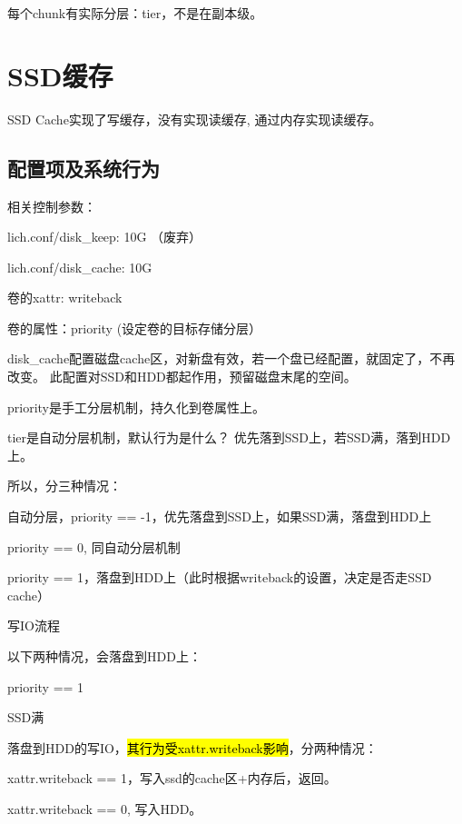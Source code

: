 每个chunk有实际分层：tier，不是在副本级。

\section{SSD缓存}

SSD Cache实现了写缓存，没有实现读缓存, 通过内存实现读缓存。

\subsection{配置项及系统行为}

相关控制参数：
\begin{enumbox}
\item lich.conf/disk\_keep: 10G （废弃）
\item lich.conf/disk\_cache: 10G
\item 卷的xattr: writeback
\item 卷的属性：priority (设定卷的目标存储分层）
\end{enumbox}

disk\_cache配置磁盘cache区，对新盘有效，若一个盘已经配置，就固定了，不再改变。
此配置对SSD和HDD都起作用，预留磁盘末尾的空间。

priority是手工分层机制，持久化到卷属性上。

tier是自动分层机制，默认行为是什么？ 优先落到SSD上，若SSD满，落到HDD上。

所以，分三种情况：
\begin{compactenum}
\item 自动分层，priority == -1，优先落盘到SSD上，如果SSD满，落盘到HDD上
\item priority == 0, 同自动分层机制
\item priority == 1，落盘到HDD上（此时根据writeback的设置，决定是否走SSD cache）
\end{compactenum}

写IO流程

以下两种情况，会落盘到HDD上：
\begin{compactenum}
\item priority == 1
\item SSD满
\end{compactenum}

落盘到HDD的写IO，\hl{其行为受xattr.writeback影响}，分两种情况：
\begin{compactenum}
\item xattr.writeback == 1，写入ssd的cache区+内存后，返回。
\item xattr.writeback == 0, 写入HDD。
\end{compactenum}

